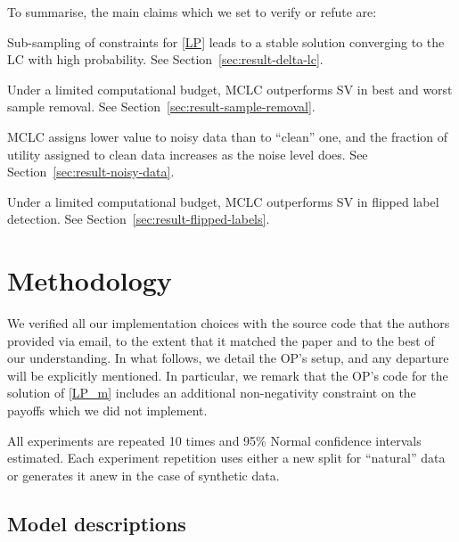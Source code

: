To summarise, the main claims which we set to verify or refute are:

\begin{claim}
  \label{claim:delta-lc}Sub-sampling of constraints for \eqref{LP} leads to a
  stable solution converging to the LC with high probability. See
  Section~\ref{sec:result-delta-lc}.
\end{claim}

\begin{claim}
  \label{claim:sample-removal}Under a limited computational budget, MCLC
  outperforms SV in best and worst sample removal. See
  Section~\ref{sec:result-sample-removal}.
\end{claim}

\begin{claim}
  \label{claim:noisy-data}MCLC assigns lower value to noisy data than to
  ``clean'' one, and the fraction of utility assigned to clean data increases
  as the noise level does. See Section~\ref{sec:result-noisy-data}.
\end{claim}

\begin{claim}
  \label{claim:flipped-labels}Under a limited computational budget, MCLC
  outperforms SV in flipped label detection. See
  Section~\ref{sec:result-flipped-labels}.
\end{claim}

\section{Methodology}

We verified all our implementation choices with the source code that the
authors provided via email, to the extent that it matched the paper and to the
best of our understanding. In what follows, we detail the OP's setup, and any
departure will be explicitly mentioned. In particular, we remark that the OP's
code for the solution of \eqref{LP_m} includes an additional non-negativity
constraint on the payoffs which we did not implement.

All experiments are repeated 10 times and 95\% Normal confidence intervals
estimated. Each experiment repetition uses either a new split for ``natural''
data or generates it anew in the case of synthetic data.

\subsection{Model descriptions}

